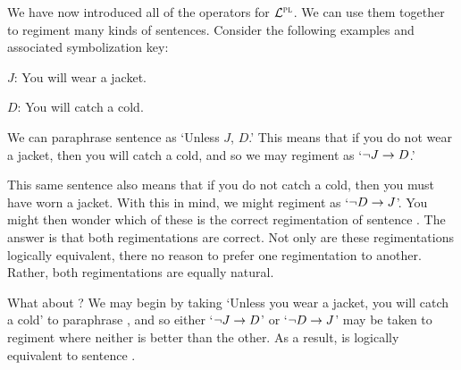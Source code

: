 We have now introduced all of the operators for $\mathcal{L}^{\textsc{pl}}$.
We can use them together to regiment many kinds of sentences.
Consider the following examples and associated symbolization key:%

\begin{earg} \label{cold}
\end{earg}


\begin{ekey}
  \item[$J$:] You will wear a jacket.
  \item[$D$:] You will catch a cold.
\end{ekey}

We can paraphrase sentence  as `Unless $J$, $D$.'
This means that if you do not wear a jacket, then you will catch a cold, and so we may regiment  as `$\neg J \rightarrow D$.'

This same sentence  also means that if you do not catch a cold, then you must have worn a jacket.
With this in mind, we might regiment  as `$\neg D \rightarrow J$'.
You might then wonder which of these is the correct regimentation of sentence .
The answer is that both regimentations are correct.
Not only are these regimentations logically equivalent, there no reason to prefer one regimentation to another.
Rather, both regimentations are equally natural.

What about ?
We may begin by taking `Unless you wear a jacket, you will catch a cold' to paraphrase , and so either `$\neg J \rightarrow D$' or `$\neg D \rightarrow J$' may be taken to regiment  where neither is better than the other.
As a result,  is logically equivalent to sentence .

